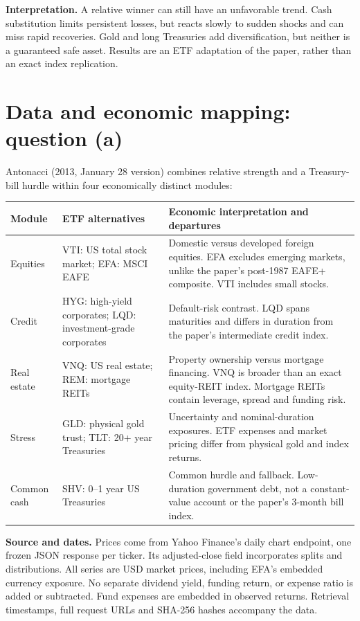 \documentclass[11pt,letterpaper]{article}
\begin{document}
\textbf{Interpretation.} A relative winner can still have an unfavorable trend. Cash substitution limits persistent losses, but reacts slowly to sudden shocks and can miss rapid recoveries. Gold and long Treasuries add diversification, but neither is a guaranteed safe asset. Results are an ETF adaptation of the paper, rather than an exact index replication.

\newpage
\section{Data and economic mapping: question (a)}
Antonacci (2013, January 28 version) combines relative strength and a Treasury-bill hurdle within four economically distinct modules:
\begin{center}\small
\begin{tabular}{l>{\raggedright\arraybackslash}p{3.8cm}>{\raggedright\arraybackslash}p{7cm}}\toprule
Module & ETF alternatives & Economic interpretation and departures\\\midrule
Equities & VTI: US total stock market; EFA: MSCI EAFE &
Domestic versus developed foreign equities. EFA excludes emerging markets, unlike the paper's post-1987 EAFE+ composite. VTI includes small stocks.\\
Credit & HYG: high-yield corporates; LQD: investment-grade corporates &
Default-risk contrast. LQD spans maturities and differs in duration from the paper's intermediate credit index.\\
Real estate & VNQ: US real estate; REM: mortgage REITs &
Property ownership versus mortgage financing. VNQ is broader than an exact equity-REIT index. Mortgage REITs contain leverage, spread and funding risk.\\
Stress & GLD: physical gold trust; TLT: 20+ year Treasuries &
Uncertainty and nominal-duration exposures. ETF expenses and market pricing differ from physical gold and index returns.\\
Common cash & SHV: 0--1 year US Treasuries &
Common hurdle and fallback. Low-duration government debt, not a constant-value account or the paper's 3-month bill index.\\\bottomrule
\end{tabular}
\end{center}
\textbf{Source and dates.} Prices come from Yahoo Finance's daily chart endpoint, one frozen JSON response per ticker. Its adjusted-close field incorporates splits and distributions. All series are USD market prices, including EFA's embedded currency exposure. No separate dividend yield, funding return, or expense ratio is added or subtracted. Fund expenses are embedded in observed returns. Retrieval timestamps, full request URLs and SHA-256 hashes accompany the data.
\end{document}
